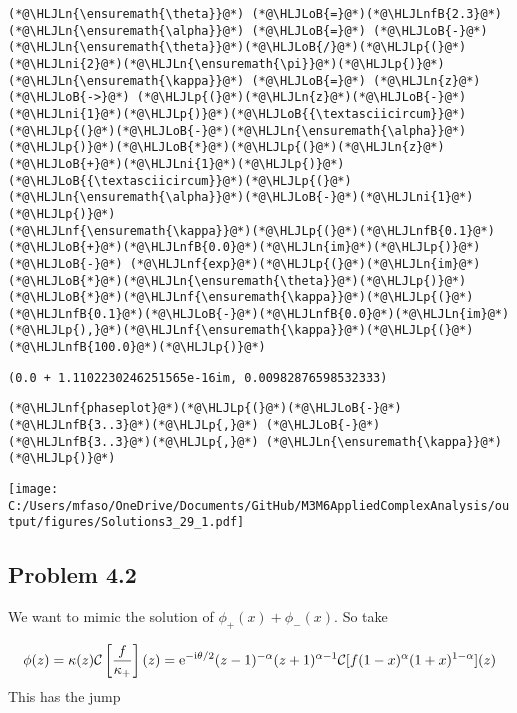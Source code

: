 \documentclass[12pt,landscape]{article}
\newcommand{\HLJLn}[1]{#1}
\newcommand{\HLJLnf}[1]{\textcolor[RGB]{66,102,213}{#1}}
\newcommand{\HLJLnfB}[1]{\textcolor[RGB]{59,151,46}{#1}}
\newcommand{\HLJLni}[1]{\textcolor[RGB]{59,151,46}{#1}}
\newcommand{\HLJLoB}[1]{\textcolor[RGB]{102,102,102}{\textbf{#1}}}
\newcommand{\HLJLp}[1]{#1}
\def\I{ {\rm i} }
\def\E{ {\rm e} }
\def\CC{ {\cal C} }
\def\br[#1]{\left[{#1}\right]}
\begin{document}
{\begin{lstlisting}
(*@\HLJLn{\ensuremath{\theta}}@*) (*@\HLJLoB{=}@*)(*@\HLJLnfB{2.3}@*)
(*@\HLJLn{\ensuremath{\alpha}}@*) (*@\HLJLoB{=}@*) (*@\HLJLoB{-}@*)(*@\HLJLn{\ensuremath{\theta}}@*)(*@\HLJLoB{/}@*)(*@\HLJLp{(}@*)(*@\HLJLni{2}@*)(*@\HLJLn{\ensuremath{\pi}}@*)(*@\HLJLp{)}@*)
(*@\HLJLn{\ensuremath{\kappa}}@*) (*@\HLJLoB{=}@*) (*@\HLJLn{z}@*) (*@\HLJLoB{->}@*) (*@\HLJLp{(}@*)(*@\HLJLn{z}@*)(*@\HLJLoB{-}@*)(*@\HLJLni{1}@*)(*@\HLJLp{)}@*)(*@\HLJLoB{{\textasciicircum}}@*)(*@\HLJLp{(}@*)(*@\HLJLoB{-}@*)(*@\HLJLn{\ensuremath{\alpha}}@*)(*@\HLJLp{)}@*)(*@\HLJLoB{*}@*)(*@\HLJLp{(}@*)(*@\HLJLn{z}@*)(*@\HLJLoB{+}@*)(*@\HLJLni{1}@*)(*@\HLJLp{)}@*)(*@\HLJLoB{{\textasciicircum}}@*)(*@\HLJLp{(}@*)(*@\HLJLn{\ensuremath{\alpha}}@*)(*@\HLJLoB{-}@*)(*@\HLJLni{1}@*)(*@\HLJLp{)}@*)
(*@\HLJLnf{\ensuremath{\kappa}}@*)(*@\HLJLp{(}@*)(*@\HLJLnfB{0.1}@*)(*@\HLJLoB{+}@*)(*@\HLJLnfB{0.0}@*)(*@\HLJLn{im}@*)(*@\HLJLp{)}@*) (*@\HLJLoB{-}@*) (*@\HLJLnf{exp}@*)(*@\HLJLp{(}@*)(*@\HLJLn{im}@*)(*@\HLJLoB{*}@*)(*@\HLJLn{\ensuremath{\theta}}@*)(*@\HLJLp{)}@*)(*@\HLJLoB{*}@*)(*@\HLJLnf{\ensuremath{\kappa}}@*)(*@\HLJLp{(}@*)(*@\HLJLnfB{0.1}@*)(*@\HLJLoB{-}@*)(*@\HLJLnfB{0.0}@*)(*@\HLJLn{im}@*)(*@\HLJLp{),}@*)(*@\HLJLnf{\ensuremath{\kappa}}@*)(*@\HLJLp{(}@*)(*@\HLJLnfB{100.0}@*)(*@\HLJLp{)}@*)
\end{lstlisting}

\begin{lstlisting}
(0.0 + 1.1102230246251565e-16im, 0.00982876598532333)
\end{lstlisting}


\begin{lstlisting}
(*@\HLJLnf{phaseplot}@*)(*@\HLJLp{(}@*)(*@\HLJLoB{-}@*)(*@\HLJLnfB{3..3}@*)(*@\HLJLp{,}@*) (*@\HLJLoB{-}@*)(*@\HLJLnfB{3..3}@*)(*@\HLJLp{,}@*) (*@\HLJLn{\ensuremath{\kappa}}@*)(*@\HLJLp{)}@*)
\end{lstlisting}

\texttt{[image: C:/Users/mfaso/OneDrive/Documents/GitHub/M3M6AppliedComplexAnalysis/output/figures/Solutions3\_29\_1.pdf]}

\subsection{Problem 4.2}
We want to mimic the solution of $\phi_+(x) + \phi_-(x)$. So take

\[
\phi(z) = \kappa(z) \CC\br[{f \over \kappa_+}](z) =\E^{-\I \theta/2} (z-1)^{-\alpha}(z+1)^{\alpha-1} \CC[f (1-x)^{\alpha}(1+x)^{1-\alpha}](z)
\]
This has the jump


}
\end{document}
